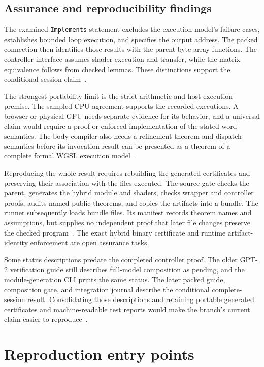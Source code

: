 \documentclass[11pt]{article}
\newcommand{\code}[1]{\texttt{#1}}
\begin{document}
\subsection{Assurance and reproducibility findings}

The examined \code{Implements} statement excludes the execution model's failure cases, establishes bounded loop execution, and specifies the output address.  The packed connection then identifies those results with the parent byte-array functions.  The controller interface assumes shader execution and transfer, while the matrix equivalence follows from checked lemmas.  These distinctions support the conditional session claim~\cite{execution,packedshader,backend}.

The strongest portability limit is the strict arithmetic and host-execution premise.  The sampled CPU agreement supports the recorded executions.  A browser or physical GPU needs separate evidence for its behavior, and a universal claim would require a proof or enforced implementation of the stated word semantics.  The body compiler also needs a refinement theorem and dispatch semantics before its invocation result can be presented as a theorem of a complete formal WGSL execution model~\cite{wgsl,execution}.

Reproducing the whole result requires rebuilding the generated certificates and preserving their association with the files executed.  The source gate checks the parent, generates the hybrid module and shaders, checks wrapper and controller proofs, audits named public theorems, and copies the artifacts into a bundle.  The runner subsequently loads bundle files.  Its manifest records theorem names and assumptions, but supplies no independent proof that later file changes preserve the checked program~\cite{build,host}.  The exact hybrid binary certificate and runtime artifact-identity enforcement are open assurance tasks.

Some status descriptions predate the completed controller proof.  The older GPT-2 verification guide still describes full-model composition as pending, and the module-generation CLI prints the same status.  The later packed guide, composition gate, and integration journal describe the conditional complete-session result.  Consolidating those descriptions and retaining portable generated certificates and machine-readable test reports would make the branch's current claim easier to reproduce~\cite{packedguide,journal,build,bodytests}.

\section{Reproduction entry points}
\end{document}
